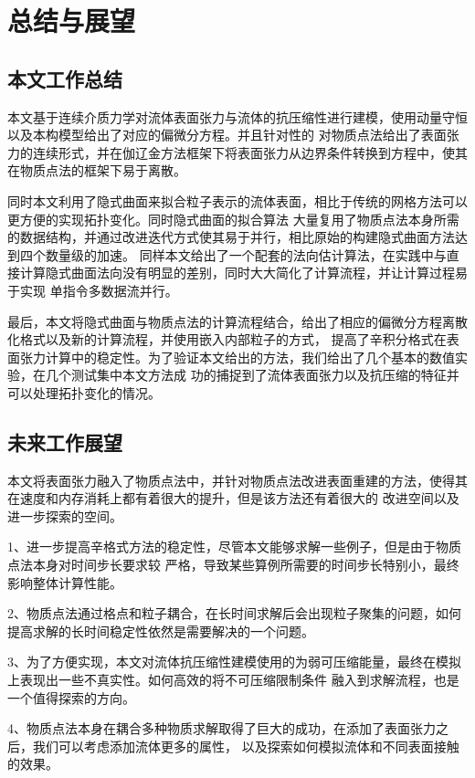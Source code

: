 \chapter{总结与展望}
\section{本文工作总结}
本文基于连续介质力学对流体表面张力与流体的抗压缩性进行建模，使用动量守恒以及本构模型给出了对应的偏微分方程。并且针对性的
对物质点法给出了表面张力的连续形式，并在伽辽金方法框架下将表面张力从边界条件转换到方程中，使其在物质点法的框架下易于离散。

同时本文利用了隐式曲面来拟合粒子表示的流体表面，相比于传统的网格方法可以更方便的实现拓扑变化。同时隐式曲面的拟合算法
大量复用了物质点法本身所需的数据结构，并通过改进迭代方式使其易于并行，相比原始的构建隐式曲面方法达到四个数量级的加速。
同样本文给出了一个配套的法向估计算法，在实践中与直接计算隐式曲面法向没有明显的差别，同时大大简化了计算流程，并让计算过程易于实现
单指令多数据流并行。

最后，本文将隐式曲面与物质点法的计算流程结合，给出了相应的偏微分方程离散化格式以及新的计算流程，并使用嵌入内部粒子的方式，
提高了辛积分格式在表面张力计算中的稳定性。为了验证本文给出的方法，我们给出了几个基本的数值实验，在几个测试集中本文方法成
功的捕捉到了流体表面张力以及抗压缩的特征并可以处理拓扑变化的情况。
\section{未来工作展望}
本文将表面张力融入了物质点法中，并针对物质点法改进表面重建的方法，使得其在速度和内存消耗上都有着很大的提升，但是该方法还有着很大的
改进空间以及进一步探索的空间。

1、进一步提高辛格式方法的稳定性，尽管本文能够求解一些例子，但是由于物质点法本身对时间步长要求较
严格，导致某些算例所需要的时间步长特别小，最终影响整体计算性能。

2、物质点法通过格点和粒子耦合，在长时间求解后会出现粒子聚集的问题，如何提高求解的长时间稳定性依然是需要解决的一个问题。

3、为了方便实现，本文对流体抗压缩性建模使用的为弱可压缩能量，最终在模拟上表现出一些不真实性。如何高效的将不可压缩限制条件
融入到求解流程，也是一个值得探索的方向。

4、物质点法本身在耦合多种物质求解取得了巨大的成功，在添加了表面张力之后，我们可以考虑添加流体更多的属性，
以及探索如何模拟流体和不同表面接触的效果。
